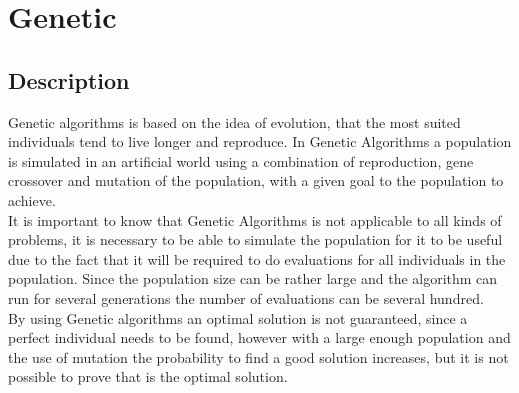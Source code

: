 \section{Genetic}
\subsection{Description}
Genetic algorithms is based on the idea of evolution, that the most suited individuals tend to live longer and reproduce. In Genetic Algorithms a population is simulated in an artificial world using a combination of reproduction, gene crossover and mutation of the population, with a given goal to the population to achieve.\cite{GAHandbook1}\\
It is important to know that Genetic Algorithms is not applicable to all kinds of problems, it is necessary to be able to simulate the population for it to be useful due to the fact that it will be required to do evaluations for all individuals in the population. Since the population size can be rather large and the algorithm can run for several generations the number of evaluations can be several hundred.\\
By using Genetic algorithms an optimal solution is not guaranteed, since a perfect individual needs to be found, however with a large enough population and the use of mutation the probability to find a good solution increases, but it is not possible to prove that is the optimal solution.


